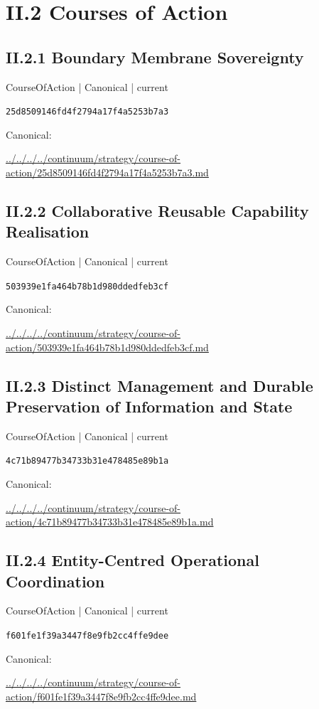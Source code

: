 \documentclass[10pt,a4paper]{article}
\begin{document}
\section*{II.2 Courses of Action}
\subsection*{II.2.1 Boundary Membrane Sovereignty}
\label{element-25d8509146fd4f2794a17f4a5253b7a3}
{\small CourseOfAction | Canonical | current}\par
\texttt{25d8509146fd4f2794a17f4a5253b7a3}\par
Canonical: \par
{\footnotesize\url{../../../../continuum/strategy/course-of-action/25d8509146fd4f2794a17f4a5253b7a3.md}}\par
\subsection*{II.2.2 Collaborative Reusable Capability Realisation}
\label{element-503939e1fa464b78b1d980ddedfeb3cf}
{\small CourseOfAction | Canonical | current}\par
\texttt{503939e1fa464b78b1d980ddedfeb3cf}\par
Canonical: \par
{\footnotesize\url{../../../../continuum/strategy/course-of-action/503939e1fa464b78b1d980ddedfeb3cf.md}}\par
\subsection*{II.2.3 Distinct Management and Durable Preservation of Information and State}
\label{element-4c71b89477b34733b31e478485e89b1a}
{\small CourseOfAction | Canonical | current}\par
\texttt{4c71b89477b34733b31e478485e89b1a}\par
Canonical: \par
{\footnotesize\url{../../../../continuum/strategy/course-of-action/4c71b89477b34733b31e478485e89b1a.md}}\par
\subsection*{II.2.4 Entity-Centred Operational Coordination}
\label{element-f601fe1f39a3447f8e9fb2cc4ffe9dee}
{\small CourseOfAction | Canonical | current}\par
\texttt{f601fe1f39a3447f8e9fb2cc4ffe9dee}\par
Canonical: \par
{\footnotesize\url{../../../../continuum/strategy/course-of-action/f601fe1f39a3447f8e9fb2cc4ffe9dee.md}}\par
\end{document}
